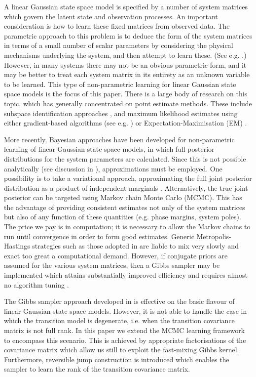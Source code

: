 \documentclass[journal,10pt]{IEEEtran}
\begin{document}
A linear Gaussian state space model is specified by a number of system matrices which govern the latent state and observation processes. An important consideration is how to learn these fixed matrices from observed data. The parametric approach to this problem is to deduce the form of the system matrices in terms of a small number of scalar parameters by considering the physical mechanisms underlying the system, and then attempt to learn these. (See e.g. \cite{Kantas2009,Andrieu2010}.) However, in many systems there may not be an obvious parametric form, and it may be better to treat each system matrix in its entirety as an unknown variable to be learned. This type of non-parametric learning for linear Gaussian state space models is the focus of this paper. There is a large body of research on this topic, which has generally concentrated on point estimate methods. These include subspace identification approaches \cite{VanOverschee1991,Viberg1995}, and maximum likelihood estimates using either gradient-based algorithms (see e.g. \cite{Cappe2005,Sarkka2013}) or Expectation-Maximisation (EM) \cite{Shumway1982,Digalakis1993,Ghahramani1996,Gibson2005,Li2009}.

More recently, Bayesian approaches have been developed for non-parametric learning of linear Gaussian state space models, in which full posterior distributions for the system parameters are calculated. Since this is not possible analytically (see discussion in \cite{Beal2003}), approximations must be employed. One possibility is to take a variational approach, approximating the full joint posterior distribution as a product of independent marginals \cite{Ghahramani2001,Beal2003,Barber2007}. Alternatively, the true joint posterior can be targeted using Markov chain Monte Carlo (MCMC). This has the advantage of providing consistent estimates not only of the system matrices but also of any function of these quantities (e.g. phase margins, system poles). The price we pay is in computation; it is necessary to allow the Markov chains to run until convergence in order to form good estimates. Generic Metropolis-Hastings strategies such as those adopted in \cite{Ninness2010} are liable to mix very slowly and exact too great a computational demand. However, if conjugate priors are assumed for the various system matrices, then a Gibbs sampler may be implemented which attains substantially improved efficiency and requires almost no algorithm tuning \cite{Wills2012}.

The Gibbs sampler approach developed in \cite{Wills2012} is effective on the basic flavour of linear Gaussian state space models. However, it is not able to handle the case in which the transition model is degenerate, i.e. when the transition covariance matrix is not full rank. In this paper we extend the MCMC learning framework to encompass this scenario. This is achieved by appropriate factorisations of the covariance matrix which allow us still to exploit the fast-mixing Gibbs kernel. Furthermore, reversible jump construction \cite{Green1995,Green2009} is introduced which enables the sampler to learn the rank of the transition covariance matrix.
\end{document}
